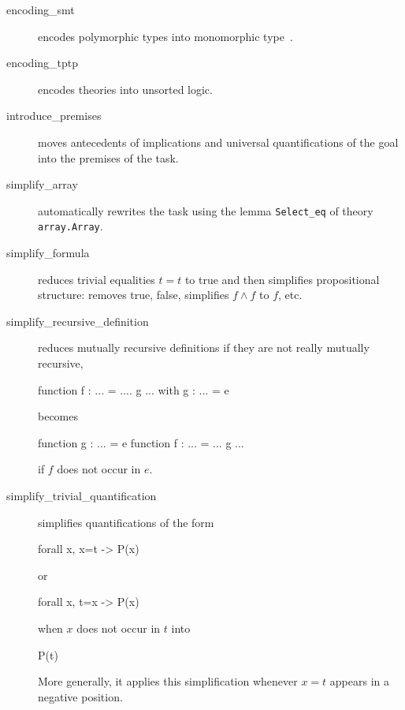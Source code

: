 \begin{description}


\item[encoding\_smt]
  encodes polymorphic types into monomorphic type~\cite{conchon08smt}.

\item[encoding\_tptp]
  encodes theories into unsorted logic. %





\item[introduce\_premises] moves antecedents of implications and
  universal quantifications of the goal into the premises of the task.


\item[simplify\_array] automatically rewrites the task using the lemma
  \verb|Select_eq| of theory \verb|array.Array|.

\item[simplify\_formula] reduces trivial equalities $t=t$ to true and
  then simplifies propositional structure: removes true, false, simplifies
  $f \land f$ to $f$, etc.

\item[simplify\_recursive\_definition] reduces mutually recursive
  definitions if they are not really mutually recursive, \eg
\begin{whycode}
function f : ... = .... g ...
with g : ... = e
\end{whycode}
becomes
\begin{whycode}
function g : ... = e
function f : ... = ... g ...
\end{whycode}
if $f$ does not occur in $e$.

\item[simplify\_trivial\_quantification]
  simplifies quantifications of the form
\begin{whycode}
forall x, x=t -> P(x)
\end{whycode}
or
\begin{whycode}
forall x, t=x -> P(x)
\end{whycode}
when $x$ does not occur in $t$ into
\begin{whycode}
P(t)
\end{whycode}
  More generally, it applies this simplification whenever $x=t$ appears
  in a negative position.


\end{description}

